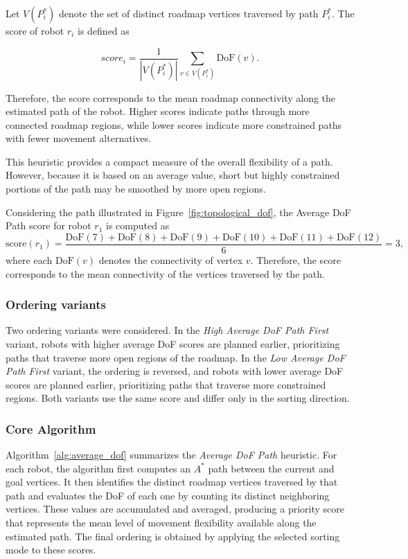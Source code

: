 Let \(V(P_i^\ast)\) denote the set of distinct roadmap vertices traversed by path \(P_i^\ast\). The score of robot \(r_i\) is defined as

\begin{equation}
    score_i =
    \frac{1}{|V(P_i^\ast)|}
    \sum_{v \in V(P_i^\ast)} \mathrm{DoF}(v).
\end{equation}

Therefore, the score corresponds to the mean roadmap connectivity along the estimated path of the robot. Higher scores indicate paths through more connected roadmap regions, while lower scores indicate more constrained paths with fewer movement alternatives.

This heuristic provides a compact measure of the overall flexibility of a path. However, because it is based on an average value, short but highly constrained portions of the path may be smoothed by more open regions.

Considering the path illustrated in Figure~\ref{fig:topological_dof}, the Average DoF Path score for robot $r_1$ is computed as
\[
    \mathrm{score}(r_1) =
    \frac{
    \mathrm{DoF}(7) +
    \mathrm{DoF}(8) +
    \mathrm{DoF}(9) +
    \mathrm{DoF}(10) +
    \mathrm{DoF}(11) +
    \mathrm{DoF}(12)
    }{6}
    =
    3,
\]
where each $\mathrm{DoF}(v)$ denotes the connectivity of vertex $v$. Therefore, the score corresponds to the mean connectivity of the vertices traversed by the path.

\subsubsection{Ordering variants}
\label{subsubsec:average_dof_path_ordering_variants}
\hspace{\parindent}
Two ordering variants were considered. In the \textit{High Average DoF Path First} variant, robots with higher average DoF scores are planned earlier, prioritizing paths that traverse more open regions of the roadmap.
In the \textit{Low Average DoF Path First} variant, the ordering is reversed, and robots with lower average DoF scores are planned earlier, prioritizing paths that traverse more constrained regions. Both variants use the same score and differ only in the sorting direction.
\subsubsection{Core Algorithm}
\label{subsubsec:average_dof_pseudocode}
\hspace{\parindent}
Algorithm~\ref{alg:average_dof} summarizes the \textit{Average DoF Path} heuristic. For each robot, the algorithm first computes an \(A^*\) path between the current and goal vertices. It then identifies the distinct roadmap vertices traversed by that path and evaluates the DoF of each one by counting its distinct neighboring vertices. These values are accumulated and averaged, producing a priority score that represents the mean level of movement flexibility available along the estimated path. The final ordering is obtained by applying the selected sorting mode to these scores.

